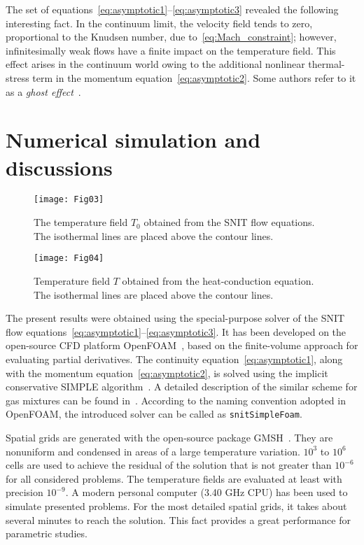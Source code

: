 \documentclass[smallextended, final]{svjour3} %
\begin{document}
The set of equations~\eqref{eq:asymptotic1}--\eqref{eq:asymptotic3} revealed the following interesting fact.
In the continuum limit, the velocity field tends to zero, proportional to the Knudsen number,
due to~\eqref{eq:Mach_constraint}; however, infinitesimally weak flows
have a finite impact on the temperature field.
This effect arises in the continuum world owing to the additional nonlinear thermal-stress term
in the momentum equation~\eqref{eq:asymptotic2}.
Some authors refer to it as a \emph{ghost effect}~\cite{Sone2002, Sone2007}.

\section{Numerical simulation and discussions}

\begin{figure}[ht]
    \centering
    \texttt{[image: Fig03]}
    \caption{The temperature field \(T_0\) obtained from the SNIT flow equations.
        The isothermal lines are placed above the contour lines.}
    \label{fig:moving:T_asym}
\end{figure}

\begin{figure}[ht]
    \centering
    \texttt{[image: Fig04]}
    \caption{Temperature field \(T\) obtained from the heat-conduction equation.
        The isothermal lines are placed above the contour lines.}
    \label{fig:moving:T_heat}
\end{figure}

The present results were obtained using the special-purpose solver of
the SNIT flow equations~\eqref{eq:asymptotic1}--\eqref{eq:asymptotic3}.
It has been developed on the open-source CFD platform OpenFOAM\textregistered{}~\cite{OpenFOAM1998},
based on the finite-volume approach for evaluating partial derivatives.
The continuity equation~\eqref{eq:asymptotic1}, along with the momentum equation~\eqref{eq:asymptotic2},
is solved using the implicit conservative SIMPLE algorithm~\cite{SIMPLE}.
A detailed description of the similar scheme for gas mixtures can be found in~\cite{Laneryd2007}.
According to the naming convention adopted in OpenFOAM\textregistered{},
the introduced solver can be called as \verb+snitSimpleFoam+.

Spatial grids are generated with the open-source package GMSH~\cite{GMSH}.
They are nonuniform and condensed in areas of a large temperature variation.
\(10^3\) to \(10^6\) cells are used to achieve the residual of the solution
that is not greater than \(10^{-6}\) for all considered problems.
The temperature fields are evaluated at least with precision \(10^{-9}\).
A modern personal computer (3.40 GHz CPU) has been used to simulate presented problems.
For the most detailed spatial grids, it takes about several minutes to reach the solution.
This fact provides a great performance for parametric studies.
\end{document}
